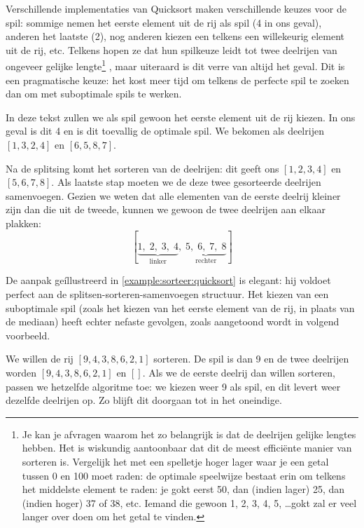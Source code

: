 \begin{example}
Verschillende implementaties van Quicksort maken verschillende keuzes voor de spil: sommige
nemen het eerste element uit de rij als spil (4 in ons geval), anderen het laatste (2), nog anderen
kiezen een telkens een willekeurig element uit de rij, etc. Telkens hopen ze dat hun
spilkeuze leidt tot twee deelrijen van ongeveer gelijke lengte\footnote{Je kan je afvragen
waarom het zo belangrijk is dat de deelrijen gelijke lengtes hebben. Het is wiskundig aantoonbaar
dat dit de meest effici\"ente manier van sorteren is. Vergelijk het met een spelletje hoger lager
waar je een getal tussen 0 en 100 moet raden: de optimale speelwijze bestaat erin
om telkens het middelste element te raden: je gokt eerst 50, dan (indien lager) 25, dan (indien hoger)
37 of 38, etc. Iemand die gewoon 1, 2, 3, 4, 5, \dots gokt zal er veel langer over doen om het getal te vinden.}
, maar uiteraard is dit verre van altijd het geval. Dit is een pragmatische keuze:
het kost meer tijd om telkens de perfecte spil te zoeken dan om met suboptimale spils te werken.

In deze tekst zullen we als spil gewoon het eerste element uit de rij kiezen. In ons geval
is dit 4 en is dit toevallig de optimale spil. We bekomen als deelrijen $[1,3,2,4]$
en $[6,5,8,7]$.

Na de splitsing komt het sorteren van de deelrijen: dit geeft ons $[1,2,3,4]$ en
$[5,6,7,8]$. Als laatste stap moeten we de deze twee gesorteerde deelrijen
samenvoegen. Gezien we weten dat alle elementen van de eerste deelrij
kleiner zijn dan die uit de tweede, kunnen we gewoon de twee deelrijen
aan elkaar plakken:
\[
  [\underbrace{1,\;2,\;3,\;4}_{\textrm{linker}},\;\underbrace{5,\;6,\;7,\;8}_{\textrm{rechter}}]
\]
\end{example}

De aanpak ge\'illustreerd in \cref{example:sorteer:quicksort} is elegant:
hij voldoet perfect aan de splitsen-sorteren-samenvoegen structuur. Het kiezen
van een suboptimale spil (zoals het kiezen van het eerste element
van de rij, in plaats van de mediaan) heeft echter nefaste gevolgen, zoals
aangetoond wordt in volgend voorbeeld.

\begin{example}\label{example:sorteer:quicksort-oops}
We willen de rij $[9,4,3,8,6,2,1]$ sorteren. De spil is dan 9 en de twee
deelrijen worden $[9,4,3,8,6,2,1]$ en $[]$. Als we de eerste deelrij
dan willen sorteren, passen we hetzelfde algoritme toe: we kiezen weer
9 als spil, en dit levert weer dezelfde deelrijen op. Zo blijft dit doorgaan
tot in het oneindige.
\end{example}


